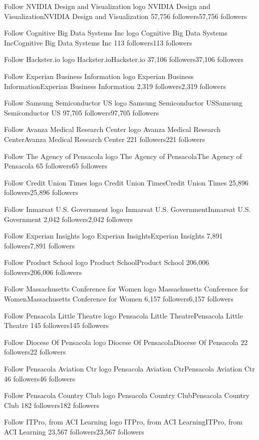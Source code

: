 Follow
NVIDIA Design and Visualization logo
NVIDIA Design and VisualizationNVIDIA Design and Visualization
57,756 followers57,756 followers

Follow
Cognitive Big Data Systems Inc logo
Cognitive Big Data Systems IncCognitive Big Data Systems Inc
113 followers113 followers

Follow
Hackster.io logo
Hackster.ioHackster.io
37,106 followers37,106 followers

Follow
Experian Business Information logo
Experian Business InformationExperian Business Information
2,319 followers2,319 followers

Follow
Samsung Semiconductor US logo
Samsung Semiconductor USSamsung Semiconductor US
97,705 followers97,705 followers

Follow
Avanza Medical Research Center logo
Avanza Medical Research CenterAvanza Medical Research Center
221 followers221 followers

Follow
The Agency of Pensacola logo
The Agency of PensacolaThe Agency of Pensacola
65 followers65 followers

Follow
Credit Union Times logo
Credit Union TimesCredit Union Times
25,896 followers25,896 followers

Follow
Inmarsat U.S. Government logo
Inmarsat U.S. GovernmentInmarsat U.S. Government
2,042 followers2,042 followers

Follow
Experian Insights logo
Experian InsightsExperian Insights
7,891 followers7,891 followers

Follow
Product School logo
Product SchoolProduct School
206,006 followers206,006 followers

Follow
Massachusetts Conference for Women logo
Massachusetts Conference for WomenMassachusetts Conference for Women
6,157 followers6,157 followers

Follow
Pensacola Little Theatre logo
Pensacola Little TheatrePensacola Little Theatre
145 followers145 followers

Follow
Diocese Of Pensacola logo
Diocese Of PensacolaDiocese Of Pensacola
22 followers22 followers

Follow
Pensacola Aviation Ctr logo
Pensacola Aviation CtrPensacola Aviation Ctr
46 followers46 followers

Follow
Pensacola Country Club logo
Pensacola Country ClubPensacola Country Club
182 followers182 followers

Follow
ITPro, from ACI Learning logo
ITPro, from ACI LearningITPro, from ACI Learning
23,567 followers23,567 followers

